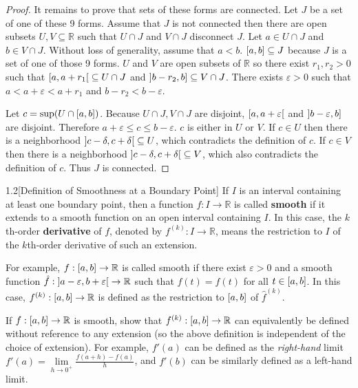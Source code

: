 \begin{proof}
	It remains to prove that sets of these forms are connected. Let $J$ be a set of one of these 9 forms. Assume that $J$ is not connected then there are open subsets $U, V\subseteq \mathbb{R}$ such that $U\cap J$ and $V\cap J$ disconnect $J$. Let $a\in U\cap J$ and $b\in V\cap J$. Without loss of generality, assume that $a < b$. $\left[{a, b}\right]\subseteq J$ because $J$ is a set of one of those 9 forms. $U$ and $V$ are open subsets of $\mathbb{R}$ so there exist $r_{1}, r_{2} > 0$ such that $\left[{a, a + r_{1}}\right[ \subseteq U\cap J$ and $\left]{b - r_{2}, b}\right] \subseteq V\cap J$. There exists $\varepsilon > 0$ such that $a < a + \varepsilon < a + r_{1}$ and $b - r_{2} < b - \varepsilon$.

	Let $c = \sup(U\cap \left[{a,b}\right])$. Because $U\cap J, V\cap J$ are disjoint, $\left[{a, a + \varepsilon}\right[$ and $\left]{b - \varepsilon, b}\right]$ are disjoint. Therefore $a + \varepsilon \leq c \leq b - \varepsilon$. $c$ is either in $U$ or $V$. If $c \in U$ then there is a neighborhood $\left]{c - \delta, c + \delta}\right[ \subseteq U$, which contradicts the definition of $c$. If $c \in V$ then there is a neighborhood $\left]{c - \delta, c + \delta}\right[ \subseteq V$, which also contradicts the definition of $c$. Thus $J$ is connected.
\end{proof}

\begin{exercise}{1.2}[Definition of Smoothness at a Boundary Point]
	If $I$ is an interval containing at least one boundary point, then a function $f: I\to \mathbb{R}$ is called \textbf{smooth} if it extends to a smooth function on an open interval containing $I$. In this case, the $k$th-order \textbf{derivative} of $f$, denoted by $f^{(k)}: I\to \mathbb{R}$, means the restriction to $I$ of the $k$th-order derivative of such an extension.

	For example, $f: \left[{a, b}\right]\to \mathbb{R}$ is called smooth if there exist $\varepsilon > 0$ and a smooth function $\hat{f}: \left]{a-\varepsilon, b+\varepsilon}\right[\to \mathbb{R}$ such that $f(t) = \hat{f}(t)$ for all $t\in\left[{a, b}\right]$. In this case, $f^{(k)}: \left[{a, b}\right]\to \mathbb{R}$ is defined as the restriction to $\left[{a, b}\right]$ of ${\hat{f}}^{(k)}$.

	If $f: \left[{a, b}\right]\to \mathbb{R}$ is smooth, show that $f^{(k)}: \left[{a, b}\right]\to \mathbb{R}$ can equivalently be defined without reference to any extension (so the above definition is independent of the choice of extension). For example, $f'(a)$ can be defined as the \textit{right-hand} limit $f'(a) = \lim\limits_{h\to 0^{+}}\frac{f(a + h) - f(a)}{h}$, and $f'(b)$ can be similarly defined as a left-hand limit.
\end{exercise}

